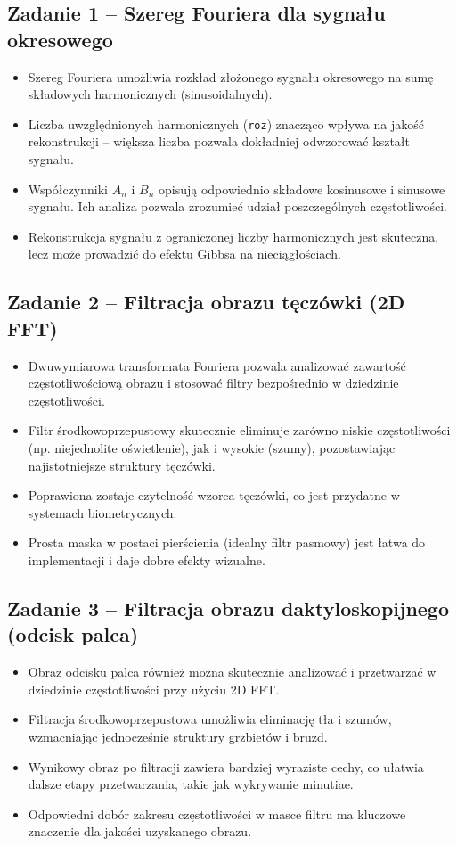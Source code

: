 \subsection{Zadanie 1 – Szereg Fouriera dla sygnału okresowego}
\begin{itemize}
	\item Szereg Fouriera umożliwia rozkład złożonego sygnału okresowego na sumę składowych harmonicznych (sinusoidalnych).
	\item Liczba uwzględnionych harmonicznych (\texttt{roz}) znacząco wpływa na jakość rekonstrukcji – większa liczba pozwala dokładniej odwzorować kształt sygnału.
	\item Współczynniki $A_n$ i $B_n$ opisują odpowiednio składowe kosinusowe i sinusowe sygnału. Ich analiza pozwala zrozumieć udział poszczególnych częstotliwości.
	\item Rekonstrukcja sygnału z ograniczonej liczby harmonicznych jest skuteczna, lecz może prowadzić do efektu Gibbsa na nieciągłościach.
\end{itemize}

\subsection{Zadanie 2 – Filtracja obrazu tęczówki (2D FFT)}
\begin{itemize}
	\item Dwuwymiarowa transformata Fouriera pozwala analizować zawartość częstotliwościową obrazu i stosować filtry bezpośrednio w dziedzinie częstotliwości.
	\item Filtr środkowoprzepustowy skutecznie eliminuje zarówno niskie częstotliwości (np. niejednolite oświetlenie), jak i wysokie (szumy), pozostawiając najistotniejsze struktury tęczówki.
	\item Poprawiona zostaje czytelność wzorca tęczówki, co jest przydatne w systemach biometrycznych.
	\item Prosta maska w postaci pierścienia (idealny filtr pasmowy) jest łatwa do implementacji i daje dobre efekty wizualne.
\end{itemize}

\subsection{Zadanie 3 – Filtracja obrazu daktyloskopijnego (odcisk palca)}
\begin{itemize}
	\item Obraz odcisku palca również można skutecznie analizować i przetwarzać w dziedzinie częstotliwości przy użyciu 2D FFT.
	\item Filtracja środkowoprzepustowa umożliwia eliminację tła i szumów, wzmacniając jednocześnie struktury grzbietów i bruzd.
	\item Wynikowy obraz po filtracji zawiera bardziej wyraziste cechy, co ułatwia dalsze etapy przetwarzania, takie jak wykrywanie minutiae.
	\item Odpowiedni dobór zakresu częstotliwości w masce filtru ma kluczowe znaczenie dla jakości uzyskanego obrazu.
\end{itemize}


